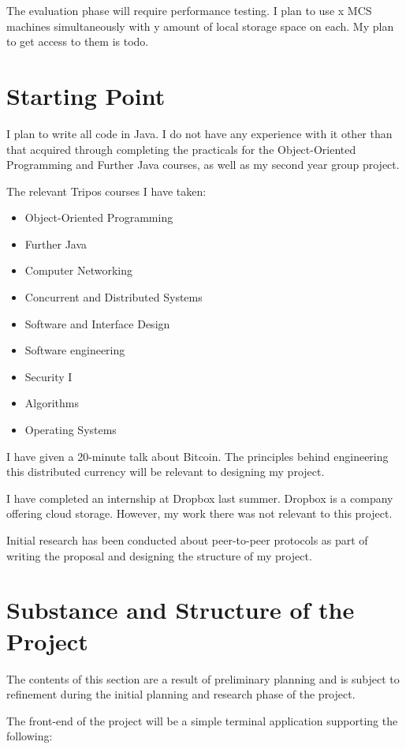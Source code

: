 \documentclass[12pt]{article}
\begin{document}
The evaluation phase will require performance testing. I plan to use x MCS machines simultaneously with y amount of local storage space on each. My plan to get access to them is todo. 

\section{Starting Point}

I plan to write all code in Java. I do not have any experience with it other than that acquired through completing the practicals for the Object-Oriented Programming and Further Java courses, as well as my second year group project.

The relevant Tripos courses I have taken:
\begin{itemize}
\item{Object-Oriented Programming}
\item{Further Java}
\item{Computer Networking}
\item{Concurrent and Distributed Systems}
\item{Software and Interface Design}
\item{Software engineering}
\item{Security I}
\item{Algorithms}
\item{Operating Systems}
\end{itemize}

I have given a 20-minute talk about Bitcoin. The principles behind engineering this distributed currency will be relevant to designing my project.

I have completed an internship at Dropbox last summer. Dropbox is a company offering cloud storage. However, my work there was not relevant to this project.

Initial research has been conducted about peer-to-peer protocols as part of writing the proposal and designing the structure of my project.

\section{Substance and Structure of the Project}

The contents of this section are a result of preliminary planning and is subject to refinement during the initial planning and research phase of the project.

The front-end of the project will be a simple terminal application supporting the following:
\end{document}
